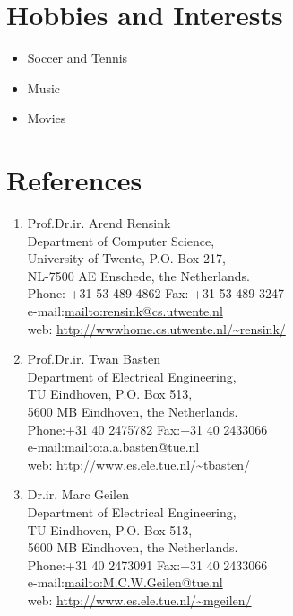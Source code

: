 \documentclass[a4paper]{article}
\begin{document}
\section{Hobbies and Interests}
\begin{itemize}
  \item Soccer and Tennis
  \item Music
  \item Movies
\end{itemize}

\section{\bf References}
\begin{enumerate}
\item Prof.Dr.ir. Arend Rensink\\
Department of Computer Science, \\
University of Twente, P.O. Box 217, \\
NL-7500 AE Enschede,
the Netherlands. \\
Phone: +31 53 489 4862 \hspace*{1cm} Fax: +31 53 489 3247 \\
e-mail:\url{mailto:rensink@cs.utwente.nl}  \\
web: \url{http://wwwhome.cs.utwente.nl/~rensink/}

\item Prof.Dr.ir. Twan Basten\\
Department of Electrical Engineering, \\
TU Eindhoven, P.O. Box 513, \\
5600 MB Eindhoven,
the Netherlands.\\
Phone:+31 40 2475782  \hspace*{1cm}    Fax:+31 40 2433066   \\
  e-mail:\url{mailto:a.a.basten@tue.nl} \\
web: \url{http://www.es.ele.tue.nl/~tbasten/}

\item Dr.ir. Marc Geilen\\
Department of Electrical Engineering, \\
TU Eindhoven, P.O. Box 513, \\
5600 MB Eindhoven,
the Netherlands.\\
Phone:+31 40 2473091  \hspace*{1cm}    Fax:+31 40 2433066   \\
  e-mail:\url{mailto:M.C.W.Geilen@tue.nl
} \\
web: \url{http://www.es.ele.tue.nl/~mgeilen/}


\end{enumerate}
\end{document}
